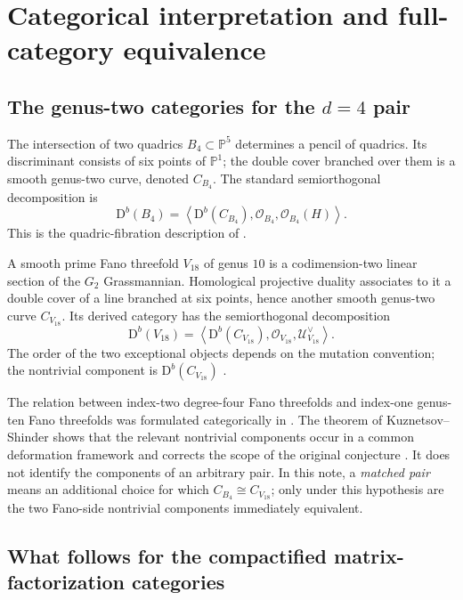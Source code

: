 \documentclass[11pt]{amsart}
\theoremstyle{definition}
\theoremstyle{remark}
\newcommand{\Db}{\mathrm D^{b}}
\begin{document}
\section{Categorical interpretation and full-category equivalence}

\subsection{The genus-two categories for the \texorpdfstring{$d=4$}{d=4} pair}

The intersection of two quadrics $B_4\subset\mathbb P^5$ determines a pencil
of quadrics.  Its discriminant consists of six points of $\mathbb P^1$; the
double cover branched over them is a smooth genus-two curve, denoted
$C_{B_4}$.  The standard semiorthogonal decomposition is
\begin{equation}
\label{eq:B4_fano_sod}
\Db(B_4)
=
\left\langle
\Db(C_{B_4}),\mathcal O_{B_4},\mathcal O_{B_4}(H)
\right\rangle.
\end{equation}
This is the quadric-fibration description of
\cite{KuzQuadric,AuelBernardaraBolognesi}.

A smooth prime Fano threefold $V_{18}$ of genus $10$ is a codimension-two
linear section of the $G_2$ Grassmannian.  Homological projective duality
associates to it a double cover of a line branched at six points, hence another
smooth genus-two curve $C_{V_{18}}$.  Its derived category has the
semiorthogonal decomposition
\begin{equation}
\label{eq:V18_fano_sod}
\Db(V_{18})
=
\left\langle
\Db(C_{V_{18}}),\mathcal O_{V_{18}},\mathcal U_{V_{18}}^{\vee}
\right\rangle.
\end{equation}
The order of the two exceptional objects depends on the mutation convention;
the nontrivial component is $\Db(C_{V_{18}})$
\cite{KuzHyperplane,KuzFano}.

The relation between index-two degree-four Fano threefolds and index-one
genus-ten Fano threefolds was formulated categorically in \cite{KuzFano}.
The theorem of Kuznetsov--Shinder shows that the relevant nontrivial
components occur in a common deformation framework and corrects the scope of
the original conjecture \cite{KuzShinder}.  It does not identify the components
of an arbitrary pair.  In this note, a \emph{matched pair} means an additional
choice for which $C_{B_4}\cong C_{V_{18}}$; only under this hypothesis are the
two Fano-side nontrivial components immediately equivalent.

\subsection{What follows for the compactified matrix-factorization categories}
\end{document}
